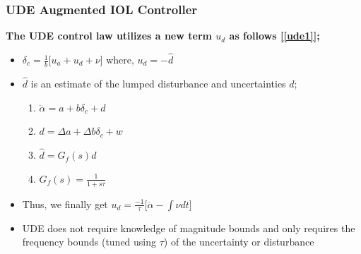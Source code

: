 \documentclass[table,10pt,red]{beamer}	%
\begin{document}
\begin{frame}
\frametitle{UDE Augmented IOL Controller}
\textbf{The UDE control law utilizes a new term $u_d$ as follows [\ref{ude1}];}
\begin{itemize}  %
		\item $\delta_c = \frac{1}{b}\Big[u_a+u_d+\nu\Big]$ where, $u_d = -\hat{d}$
		\item $\hat{d}$ is an estimate of the lumped disturbance and uncertainties $d$;

		\begin{enumerate}
			\item $\dddot{\alpha} = a + b\delta_c + d$
			\item $d = \Delta a + \Delta b \delta_c + w$
			\item $\hat{d}=G_f(s)d$
			\item $G_f(s)=\frac{1}{1+s\tau}$ \\
		\end{enumerate}
\end{itemize}

\begin{itemize}
	\item Thus, we finally get
	$u_d=\frac{-1}{\tau}\Big[\ddot{\alpha}-\int{\nu dt}\Big] \label{ude}$
	
	\item UDE does not require knowledge of magnitude bounds and only requires the frequency bounds (tuned using $\tau$) of the uncertainty or disturbance
\end{itemize}

\end{frame}
\end{document}
